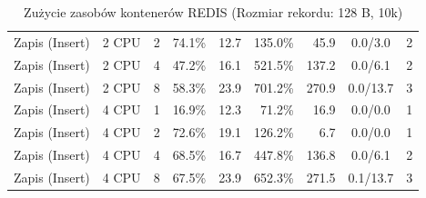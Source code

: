 \begin{table}[ht]
{\begin{tabular}{llcrrrrcc}
Zapis (Insert) & 2 CPU & 2 & 74.1\% & 12.7 & 135.0\% & 45.9 & 0.0/3.0 & 2 \\
Zapis (Insert) & 2 CPU & 4 & 47.2\% & 16.1 & 521.5\% & 137.2 & 0.0/6.1 & 2 \\
Zapis (Insert) & 2 CPU & 8 & 58.3\% & 23.9 & 701.2\% & 270.9 & 0.0/13.7 & 3 \\
Zapis (Insert) & 4 CPU & 1 & 16.9\% & 12.3 & 71.2\% & 16.9 & 0.0/0.0 & 1 \\
Zapis (Insert) & 4 CPU & 2 & 72.6\% & 19.1 & 126.2\% & 6.7 & 0.0/0.0 & 1 \\
Zapis (Insert) & 4 CPU & 4 & 68.5\% & 16.7 & 447.8\% & 136.8 & 0.0/6.1 & 2 \\
Zapis (Insert) & 4 CPU & 8 & 67.5\% & 23.9 & 652.3\% & 271.5 & 0.1/13.7 & 3 \\
\bottomrule
\end{tabular}%
}
\caption{Zużycie zasobów kontenerów REDIS (Rozmiar rekordu: 128 B, 10k)}
\label{tab:resources_redis_small_10000}
\end{table}
